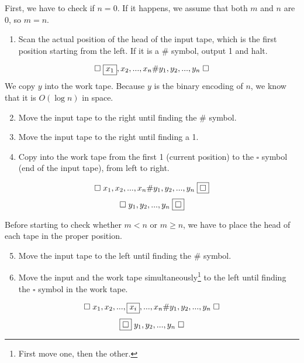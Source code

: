 \documentclass[a4paper, 10pt]{article}
\begin{document}
First, we have to check if $n = 0$. If it happens, we assume that both $m$ and $n$ are 0, so $m = n$.
\begin{enumerate}
    \item Scan the actual position of the head of the input tape, which is the first position starting from the left. If it is a $\#$ symbol, output 1 and halt.    
\end{enumerate}
\[
    \square \hspace{1mm} \boxed{x_1},x_2,...,x_n \# y_1,y_2,...,y_n \hspace{1mm} \square
\]
We copy $y$ into the work tape. Because $y$ is the binary encoding of $n$, we know that it is $O (\log n)$ in space.
\begin{enumerate}\setcounter{enumi}{1}
    \item Move the input tape to the right until finding the $\#$ symbol.
    \item Move the input tape to the right until finding a 1.
    \item Copy into the work tape from the first 1 (current position) to the $\square$ symbol (end of the input tape), from left to right.
\end{enumerate}
\[
    \square \hspace{1mm} x_1,x_2,...,x_n \# y_1,y_2,...,y_n \hspace{1mm} \boxed{\square}
\]
\[
    \square \hspace{1mm} y_1,y_2,...,y_n \hspace{1mm} \boxed{\square}    
\]

Before starting to check whether $m < n$ or $m \geq n$, we have to place the head of each tape in the proper position.
\begin{enumerate}\setcounter{enumi}{4}
    \item Move the input tape to the left until finding the $\#$ symbol.
    \item Move the input and the work tape simultaneously\footnote{First move one, then the other.} to the left until finding the $\square$ symbol in the work tape.
\end{enumerate}

\[
    \square \hspace{1mm} x_1,x_2,...,\boxed{x_i},...,x_n \# y_1,y_2,...,y_n \hspace{1mm} \square
\]
\[
    \boxed{\square} \hspace{1mm} y_1,y_2,...,y_n \hspace{1mm} \square   
\]
\end{document}
